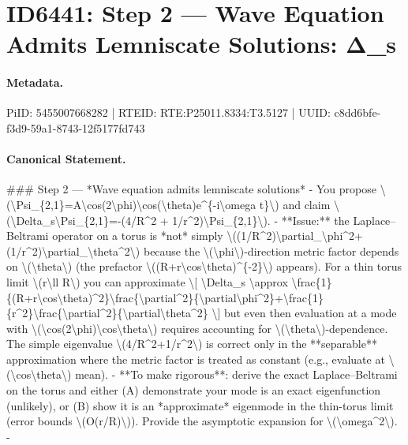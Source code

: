 \section*{ID6441: Step 2 — Wave Equation Admits Lemniscate Solutions: Δ\_s}
\paragraph{Metadata.}
PiID: 5455007668282 | RTEID: RTE:P25011.8334:T3.5127 | UUID: c8dd6bfe-f3d9-59a1-8743-12f5177fd743

\paragraph{Canonical Statement.}
\#\#\# Step 2 — *Wave equation admits lemniscate solutions* - You propose \textbackslash{}(\textbackslash{}Psi\_\{2,1\}=A\textbackslash{}cos(2\textbackslash{}phi)\textbackslash{}cos(\textbackslash{}theta)e\textasciicircum{}\{-i\textbackslash{}omega t\}\textbackslash{}) and claim \textbackslash{}(\textbackslash{}Delta\_s\textbackslash{}Psi\_\{2,1\}=-(4/R\textasciicircum{}2 + 1/r\textasciicircum{}2)\textbackslash{}Psi\_\{2,1\}\textbackslash{}). - **Issue:** the Laplace–Beltrami operator on a torus is *not* simply \textbackslash{}((1/R\textasciicircum{}2)\textbackslash{}partial\_\textbackslash{}phi\textasciicircum{}2+(1/r\textasciicircum{}2)\textbackslash{}partial\_\textbackslash{}theta\textasciicircum{}2\textbackslash{}) because the \textbackslash{}(\textbackslash{}phi\textbackslash{})-direction metric factor depends on \textbackslash{}(\textbackslash{}theta\textbackslash{}) (the prefactor \textbackslash{}((R+r\textbackslash{}cos\textbackslash{}theta)\textasciicircum{}\{-2\}\textbackslash{}) appears). For a thin torus limit \textbackslash{}(r\textbackslash{}ll R\textbackslash{}) you can approximate \textbackslash{}[ \textbackslash{}Delta\_s \textbackslash{}approx \textbackslash{}frac\{1\}\{(R+r\textbackslash{}cos\textbackslash{}theta)\textasciicircum{}2\}\textbackslash{}frac\{\textbackslash{}partial\textasciicircum{}2\}\{\textbackslash{}partial\textbackslash{}phi\textasciicircum{}2\}+\textbackslash{}frac\{1\}\{r\textasciicircum{}2\}\textbackslash{}frac\{\textbackslash{}partial\textasciicircum{}2\}\{\textbackslash{}partial\textbackslash{}theta\textasciicircum{}2\} \textbackslash{}] but even then evaluation at a mode with \textbackslash{}(\textbackslash{}cos(2\textbackslash{}phi)\textbackslash{}cos\textbackslash{}theta\textbackslash{}) requires accounting for \textbackslash{}(\textbackslash{}theta\textbackslash{})-dependence. The simple eigenvalue \textbackslash{}(4/R\textasciicircum{}2+1/r\textasciicircum{}2\textbackslash{}) is correct only in the **separable** approximation where the metric factor is treated as constant (e.g., evaluate at \textbackslash{}(\textbackslash{}cos\textbackslash{}theta\textbackslash{}) mean). - **To make rigorous**: derive the exact Laplace–Beltrami on the torus and either (A) demonstrate your mode is an exact eigenfunction (unlikely), or (B) show it is an *approximate* eigenmode in the thin-torus limit (error bounds \textbackslash{}(O(r/R)\textbackslash{})). Provide the asymptotic expansion for \textbackslash{}(\textbackslash{}omega\textasciicircum{}2\textbackslash{}). - 